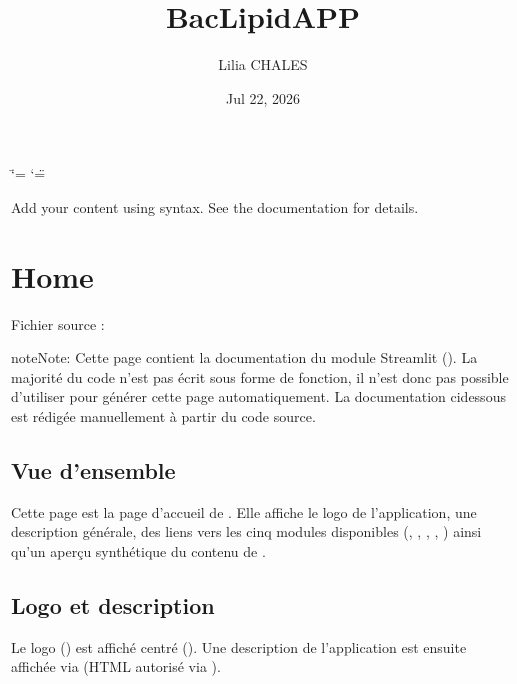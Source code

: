 \documentclass[letterpaper,10pt,english]{sphinxmanual}
\title{BacLipidAPP}
\date{Jul 22, 2026}
\author{Lilia CHALES}
\begin{document}
\ifdefined\shorthandoff
  \ifnum\catcode`\=\string=\active\shorthandoff{=}\fi
  \ifnum\catcode`\"=\active{}\fi
\fi

\pagestyle{empty}
\sphinxmaketitle
\pagestyle{plain}
\sphinxtableofcontents
\pagestyle{normal}
\label{\detokenize{index::doc}}


\sphinxAtStartPar
Add your content using  syntax. See the
documentation for details.

\sphinxstepscope


\chapter{Home}
\label{\detokenize{Home:home}}\label{\detokenize{Home::doc}}
\sphinxAtStartPar
Fichier source : 

\begin{sphinxadmonition}{note}{Note:}
\sphinxAtStartPar
Cette page contient la documentation du module Streamlit ().
La majorité du code n’est pas écrit sous forme de fonction, il n’est donc pas possible d’utiliser 
pour générer cette page automatiquement. La documentation ci\sphinxhyphen{}dessous est rédigée manuellement
à partir du code source.
\end{sphinxadmonition}


\section{Vue d’ensemble}
\label{\detokenize{Home:vue-d-ensemble}}
\sphinxAtStartPar
Cette page est la page d’accueil de . Elle affiche le logo de
l’application, une description générale, des liens vers les cinq modules
disponibles ({\hyperref[\detokenize{1_Integration::doc}]{}}, {\hyperref[\detokenize{2_BacLipidDB::doc}]{}}, {\hyperref[\detokenize{3_Export::doc}]{}},
{\hyperref[\detokenize{4_Resources::doc}]{}}, {\hyperref[\detokenize{5_Management::doc}]{}}) ainsi qu’un aperçu synthétique du
contenu de .


\section{Logo et description}
\label{\detokenize{Home:logo-et-description}}
\sphinxAtStartPar
Le logo () est affiché centré ().
Une description de l’application est ensuite affichée via 
(HTML autorisé via ).
\end{document}
